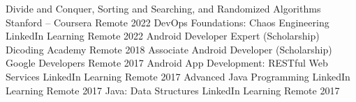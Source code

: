 \begin{cvhonors}

  \cvhonor
    {Divide and Conquer, Sorting and Searching, and Randomized Algorithms} %
    {Stanford -- Coursera} %
    {Remote} %
    {2022} %
  \cvhonor
    {DevOps Foundations: Chaos Engineering} %
    {LinkedIn Learning} %
    {Remote} %
    {2022} %
  \cvhonor
    {Android Developer Expert (Scholarship)} %
    {Dicoding Academy } %
    {Remote} %
    {2018} %
  \cvhonor
    {Associate Android Developer (Scholarship)} %
    {Google Developers} %
    {Remote} %
    {2017} %
  \cvhonor
    {Android App Development: RESTful Web Services} %
    {LinkedIn Learning} %
    {Remote} %
    {2017} %
  \cvhonor
    {Advanced Java Programming} %
    {LinkedIn Learning} %
    {Remote} %
    {2017} %
  \cvhonor
    {Java: Data Structures} %
    {LinkedIn Learning} %
    {Remote} %
    {2017} %

\end{cvhonors}
